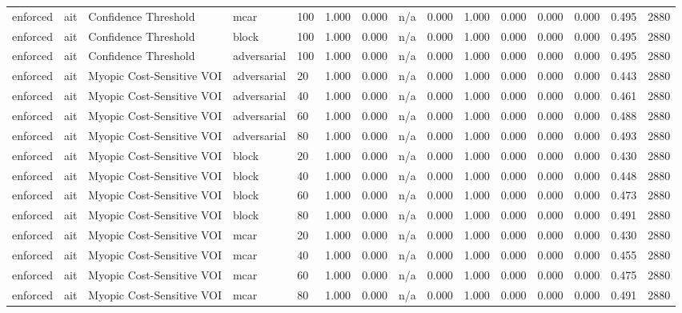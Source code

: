 \begin{table}[!ht]
{\begin{tabular}{lllllllllllllll}
enforced & ait & Confidence Threshold & mcar & 100 & 1.000 & 0.000 & n/a & 0.000 & 1.000 & 0.000 & 0.000 & 0.000 & 0.495 & 2880 \\
enforced & ait & Confidence Threshold & block & 100 & 1.000 & 0.000 & n/a & 0.000 & 1.000 & 0.000 & 0.000 & 0.000 & 0.495 & 2880 \\
enforced & ait & Confidence Threshold & adversarial & 100 & 1.000 & 0.000 & n/a & 0.000 & 1.000 & 0.000 & 0.000 & 0.000 & 0.495 & 2880 \\
enforced & ait & Myopic Cost-Sensitive VOI & adversarial & 20 & 1.000 & 0.000 & n/a & 0.000 & 1.000 & 0.000 & 0.000 & 0.000 & 0.443 & 2880 \\
enforced & ait & Myopic Cost-Sensitive VOI & adversarial & 40 & 1.000 & 0.000 & n/a & 0.000 & 1.000 & 0.000 & 0.000 & 0.000 & 0.461 & 2880 \\
enforced & ait & Myopic Cost-Sensitive VOI & adversarial & 60 & 1.000 & 0.000 & n/a & 0.000 & 1.000 & 0.000 & 0.000 & 0.000 & 0.488 & 2880 \\
enforced & ait & Myopic Cost-Sensitive VOI & adversarial & 80 & 1.000 & 0.000 & n/a & 0.000 & 1.000 & 0.000 & 0.000 & 0.000 & 0.493 & 2880 \\
enforced & ait & Myopic Cost-Sensitive VOI & block & 20 & 1.000 & 0.000 & n/a & 0.000 & 1.000 & 0.000 & 0.000 & 0.000 & 0.430 & 2880 \\
enforced & ait & Myopic Cost-Sensitive VOI & block & 40 & 1.000 & 0.000 & n/a & 0.000 & 1.000 & 0.000 & 0.000 & 0.000 & 0.448 & 2880 \\
enforced & ait & Myopic Cost-Sensitive VOI & block & 60 & 1.000 & 0.000 & n/a & 0.000 & 1.000 & 0.000 & 0.000 & 0.000 & 0.473 & 2880 \\
enforced & ait & Myopic Cost-Sensitive VOI & block & 80 & 1.000 & 0.000 & n/a & 0.000 & 1.000 & 0.000 & 0.000 & 0.000 & 0.491 & 2880 \\
enforced & ait & Myopic Cost-Sensitive VOI & mcar & 20 & 1.000 & 0.000 & n/a & 0.000 & 1.000 & 0.000 & 0.000 & 0.000 & 0.430 & 2880 \\
enforced & ait & Myopic Cost-Sensitive VOI & mcar & 40 & 1.000 & 0.000 & n/a & 0.000 & 1.000 & 0.000 & 0.000 & 0.000 & 0.455 & 2880 \\
enforced & ait & Myopic Cost-Sensitive VOI & mcar & 60 & 1.000 & 0.000 & n/a & 0.000 & 1.000 & 0.000 & 0.000 & 0.000 & 0.475 & 2880 \\
enforced & ait & Myopic Cost-Sensitive VOI & mcar & 80 & 1.000 & 0.000 & n/a & 0.000 & 1.000 & 0.000 & 0.000 & 0.000 & 0.491 & 2880 \\

\end{tabular}}
\end{table}
